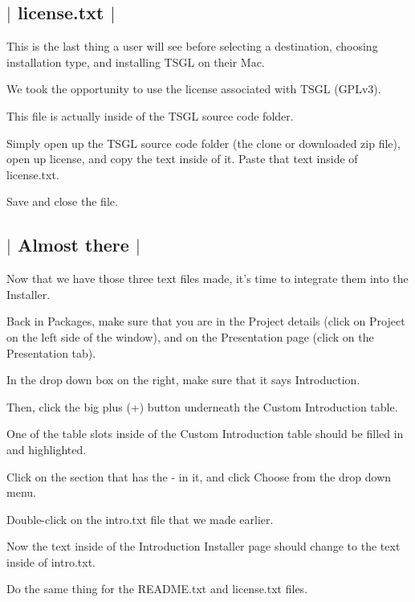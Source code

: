  \subsection*{$\vert$ {\ttfamily license.\-txt} $\vert$ }

This is the last thing a user will see before selecting a destination, choosing installation type, and installing T\-S\-G\-L on their Mac.

We took the opportunity to use the license associated with T\-S\-G\-L (G\-P\-Lv3).

This file is actually inside of the T\-S\-G\-L source code folder.

Simply open up the T\-S\-G\-L source code folder (the clone or downloaded zip file), open up {\ttfamily license}, and copy the text inside of it. Paste that text inside of {\ttfamily license.\-txt}.

Save and close the file. 

 \subsection*{$\vert$ Almost there $\vert$ }

Now that we have those three text files made, it's time to integrate them into the Installer.

Back in {\ttfamily Packages}, make sure that you are in the {\ttfamily Project} details (click on {\ttfamily Project} on the left side of the window), and on the {\ttfamily Presentation} page (click on the {\ttfamily Presentation} tab).

In the drop down box on the right, make sure that it says {\ttfamily Introduction}.

Then, click the big plus ({\ttfamily +}) button underneath the {\ttfamily Custom Introduction} table.

One of the table slots inside of the {\ttfamily Custom Introduction} table should be filled in and highlighted.

Click on the section that has the {\ttfamily -\/} in it, and click {\ttfamily Choose} from the drop down menu.

Double-\/click on the {\ttfamily intro.\-txt} file that we made earlier.

Now the text inside of the {\ttfamily Introduction} Installer page should change to the text inside of {\ttfamily intro.\-txt}.

Do the same thing for the {\ttfamily R\-E\-A\-D\-M\-E.\-txt} and {\ttfamily license.\-txt} files.

